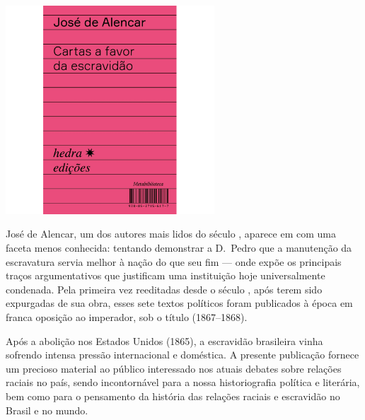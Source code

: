\pagebreak


\begin{center}
\hspace*{.5cm}\includegraphics[width=78mm]{./grid/alencar.jpg}
\end{center}

\hspace*{-7cm}\hrulefill\hspace*{-7cm}

\medskip

\noindent{}José de Alencar, um dos autores mais lidos do século , aparece em {} com uma faceta menos conhecida: tentando demonstrar a D.~Pedro  que a manutenção da escravatura servia melhor à nação do que seu fim --- onde expõe os principais traços argumentativos que justificam uma instituição hoje universalmente condenada. Pela primeira vez reeditadas desde o século , após terem sido expurgadas de sua obra, esses sete textos políticos foram publicados à época em franca oposição ao imperador, sob o título {} (1867--1868).

Após a abolição nos Estados Unidos (1865), a escravidão brasileira vinha sofrendo intensa pressão internacional e doméstica. A presente publicação fornece um precioso material ao público interessado nos atuais debates sobre relações raciais no país, sendo incontornável para a nossa historiografia política e literária, bem como para o pensamento da história das relações raciais e escravidão no Brasil e no mundo.

\vfill

\hspace*{-.4cm}\begin{minipage}[c]{.5\linewidth}
\small{
{}}
\end{minipage}

